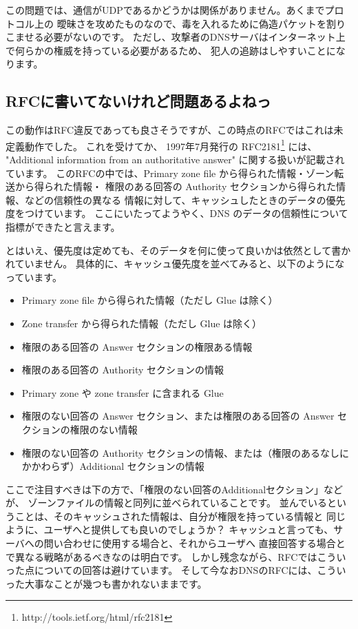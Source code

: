 この問題では、通信がUDPであるかどうかは関係がありません。あくまでプロトコル上の
曖昧さを攻めたものなので、毒を入れるために偽造パケットを割りこませる必要がないのです。
ただし、攻撃者のDNSサーバはインターネット上で何らかの権威を持っている必要があるため、
犯人の追跡はしやすいことになります。

\subsection{RFCに書いてないけれど問題あるよねっ}
この動作はRFC違反であっても良さそうですが、この時点のRFCではこれは未定義動作でした。
これを受けてか、 1997年7月発行の RFC2181\footnote{http://tools.ietf.org/html/rfc2181} には、
"Additional information from an authoritative answer" に関する扱いが記載されています。
このRFCの中では、Primary zone file から得られた情報・ゾーン転送から得られた情報・
権限のある回答の Authority セクションから得られた情報、などの信頼性の異なる
情報に対して、キャッシュしたときのデータの優先度をつけています。
ここにいたってようやく、DNS のデータの信頼性について指標ができたと言えます。

とはいえ、優先度は定めても、そのデータを何に使って良いかは依然として書かれていません。
具体的に、キャッシュ優先度を並べてみると、以下のようになっています。

\begin{itemize}
  \item Primary zone file から得られた情報（ただし Glue は除く）
  \item Zone transfer から得られた情報（ただし Glue は除く）
  \item 権限のある回答の Answer セクションの権限ある情報
  \item 権限のある回答の Authority セクションの情報
  \item Primary zone や zone transfer に含まれる Glue
  \item 権限のない回答の Answer セクション、または権限のある回答の Answer セクションの権限のない情報
  \item 権限のない回答の Authority セクションの情報、または（権限のあるなしにかかわらず）Additional セクションの情報
\end{itemize}

ここで注目すべきは下の方で、「権限のない回答のAdditionalセクション」などが、
ゾーンファイルの情報と同列に並べられていることです。
並んでいるということは、そのキャッシュされた情報は、自分が権限を持っている情報と
同じように、ユーザへと提供しても良いのでしょうか？
キャッシュと言っても、サーバへの問い合わせに使用する場合と、それからユーザへ
直接回答する場合とで異なる戦略があるべきなのは明白です。
しかし残念ながら、RFCではこういった点についての回答は避けています。
そして今なおDNSのRFCには、こういった大事なことが幾つも書かれないままです。



